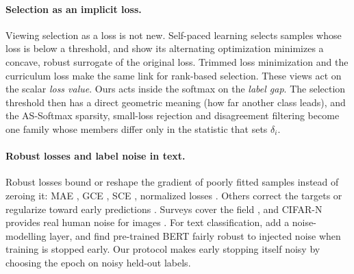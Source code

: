 \paragraph{Selection as an implicit loss.}
Viewing selection as a loss is not new. Self-paced learning \citep{kumar2010spl} selects samples
whose loss is below a threshold, and \citet{meng2017spl} show its alternating optimization
minimizes a concave, robust surrogate of the original loss. Trimmed loss minimization
\citep{shen2019trimmed} and the curriculum loss \citep{lyu2020curriculum} make the same link for
rank-based selection. These views act on the scalar \emph{loss value}. Ours acts inside the
softmax on the \emph{label gap}. The selection threshold then has a direct geometric meaning (how
far another class leads), and the AS-Softmax sparsity, small-loss rejection and disagreement
filtering become one family whose members differ only in the statistic that sets $\delta_i$.

\paragraph{Robust losses and label noise in text.}
Robust losses bound or reshape the gradient of poorly fitted samples instead of zeroing it: MAE
\citep{ghosh2017robust}, GCE \citep{zhang2018gce}, SCE \citep{wang2019sce}, normalized losses
\citep{ma2020normalized}. Others correct the targets \citep{reed2015bootstrap,patrini2017making}
or regularize toward early predictions \citep{liu2020elr}. Surveys cover the field
\citep{song2022survey}, and CIFAR-N provides real human noise for images \citep{wei2022cifarn}.
For text classification, \citet{jindal2019effective} add a noise-modelling layer, and
\citet{zhu2022bert} find pre-trained BERT fairly robust to injected noise when training is stopped
early. Our protocol makes early stopping itself noisy by choosing the epoch on noisy held-out labels.
